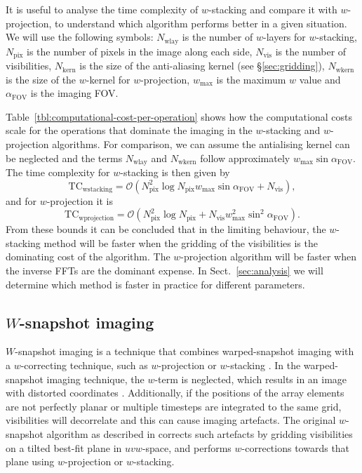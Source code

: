 \documentclass[useAMS,usenatbib]{mn2e}
\begin{document}
It is useful to analyse the time complexity of $w$-stacking and compare it with $w$-projection, to understand which algorithm performs better in a given situation. We will use the following symbols: $N_\textrm{wlay}$ is the number of $w$-layers for $w$-stacking, $N_\textrm{pix}$ is the number of pixels in the image along each side, $N_\textrm{vis}$ is the number of visibilities, $N_\textrm{kern}$ is the size of the anti-aliasing kernel (see \S\ref{sec:gridding}), $N_\textrm{wkern}$ is the size of the $w$-kernel for $w$-projection, $w_{\max}$ is the maximum $w$ value and $\alpha_\textrm{FOV}$ is the imaging FOV.

Table~\ref{tbl:computational-cost-per-operation} shows how the computational costs scale for the operations that dominate the imaging in the $w$-stacking and $w$-projection algorithms. For comparison, we can assume the antialising kernel can be neglected and the terms $N_\textrm{wlay}$ and $N_\textrm{wkern}$ follow approximately $w_{\max} \sin \alpha_\textrm{FOV}$. The time complexity for $w$-stacking is then given by
\begin{equation}
\textrm{TC}_\textrm{wstacking}=\mathcal{O}\left(N^2_\textrm{pix} \log N_\textrm{pix} w_{\max} \sin \alpha_\textrm{FOV}+ N_\textrm{vis} \right),
\end{equation}
and for $w$-projection it is
\begin{equation}
\textrm{TC}_\textrm{wprojection}=\mathcal{O}\left(N^2_\textrm{pix} \log N_\textrm{pix} + N_\textrm{vis} w_{\max}^2 \sin^2 \alpha_\textrm{FOV}\right).
\end{equation}
From these bounds it can be concluded that in the limiting behaviour, the $w$-stacking method will be faster when the gridding of the visibilities is the dominating cost of the algorithm. The $w$-projection algorithm will be faster when the inverse FFTs are the dominant expense. In Sect.~\ref{sec:analysis} we will determine which method is faster in practice for different parameters.

\subsection{$W$-snapshot imaging} \label{sec:snapshot-imaging-theory}
$W$-snapshot imaging is a technique that combines warped-snapshot imaging with a $w$-correcting technique, such as $w$-projection or $w$-stacking \citep{widefield-imaging-ska-cornwell}. In the warped-snapshot imaging technique, the $w$-term is neglected, which results in an image with distorted coordinates \citep{perley-noncoplanar-arrays,mwa-interferometric-imaging}. Additionally, if the positions of the array elements are not perfectly planar or multiple timesteps are integrated to the same grid, visibilities will decorrelate and this can cause imaging artefacts. The original $w$-snapshot algorithm as described in \citet{widefield-imaging-ska-cornwell} corrects such artefacts by gridding visibilities on a tilted best-fit plane in $uvw$-space, and performs $w$-corrections towards that plane using $w$-projection or $w$-stacking.
\end{document}

